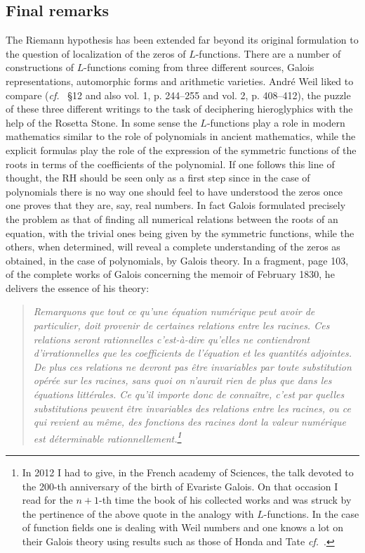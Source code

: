\documentclass[12pt]{article}
\newcommand{\cff}{{\it cf.}~}
\begin{document}
\subsection{Final remarks}
The Riemann hypothesis has been extended far beyond its original formulation to the question of localization of the zeros of $L$-functions. There are  a number of constructions of $L$-functions coming from three different sources, Galois representations, automorphic forms and arithmetic varieties. Andr\' e Weil liked to compare (\cff \cite{B2} \S 12 and also \cite{weilcomplete} vol. 1, p. 244--255 and vol. 2, p. 408--412), the puzzle of these three different writings to the task of deciphering hieroglyphics with the help of the Rosetta Stone. In some sense the $L$-functions  play a role in modern mathematics similar to the role of polynomials in ancient mathematics, while the explicit formulas play the role of the expression of the symmetric functions of the roots in terms of the coefficients of the polynomial. If one follows this line of thought, the RH should be seen only as a first step since in the case of polynomials  there  is no way one should feel to have understood the zeros  
once one proves that they  are, say, real numbers. In fact Galois formulated precisely the problem as that of finding all numerical relations between the roots of an equation, with the  trivial ones being given by the symmetric functions, while the others, when determined, will reveal 
a complete understanding of the zeros as obtained, in the case of polynomials, by Galois theory.
In a fragment, page 103, of the complete works of Galois  \cite{Galois} concerning the memoir of February 1830, he delivers the essence of his theory:
\begin{quote}{\it 
Remarquons que tout ce qu'une \'equation num\'erique peut avoir de particulier, doit provenir de certaines relations entre les racines. Ces relations seront rationnelles c'est-\`a-dire qu'elles ne contiendront d'irrationnelles que les coefficients de l'\'equation et les quantit\'es adjointes. De plus ces relations ne devront pas \^etre invariables par toute substitution op\'er\'ee sur les racines, sans quoi on n'aurait rien de plus que dans les \'equations litt\'erales. Ce qu'il importe donc de conna\^itre, c'est par quelles substitutions peuvent \^etre invariables des relations entre les racines, ou ce qui revient au m\^eme, des fonctions des racines dont la valeur num\'erique est d\'eterminable rationnellement.\footnote{In 2012 I had to give, in the French academy of Sciences, the talk devoted to the 200-th anniversary of the birth of Evariste Galois. On that occasion I read for the $n+1$-th time the book of his collected works and was struck by the pertinence of the above quote in the analogy with $L$-functions. In the case of function fields one is dealing with Weil numbers and one knows a lot on their Galois theory using results such as those of Honda and Tate \cff\cite{Tatebbk}.}  
}\end{quote}
\end{document}
